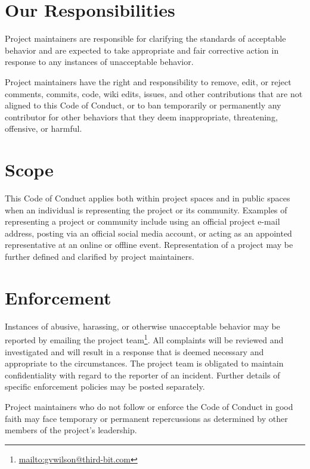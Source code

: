 \documentclass[
]{krantz}
\renewcommand{\href}[2]{#2\footnote{\url{#1}}}
\begin{document}
\hypertarget{conduct-responsibilities}{%
\section{Our Responsibilities}\label{conduct-responsibilities}}

Project maintainers are responsible for clarifying the standards of acceptable
behavior and are expected to take appropriate and fair corrective action in
response to any instances of unacceptable behavior.

Project maintainers have the right and responsibility to remove, edit, or reject
comments, commits, code, wiki edits, issues, and other contributions that are
not aligned to this Code of Conduct, or to ban temporarily or permanently any
contributor for other behaviors that they deem inappropriate, threatening,
offensive, or harmful.

\hypertarget{conduct-scope}{%
\section{Scope}\label{conduct-scope}}

This Code of Conduct applies both within project spaces and in public spaces
when an individual is representing the project or its community. Examples of
representing a project or community include using an official project e-mail
address, posting via an official social media account, or acting as an appointed
representative at an online or offline event. Representation of a project may be
further defined and clarified by project maintainers.

\hypertarget{conduct-enforcement}{%
\section{Enforcement}\label{conduct-enforcement}}

Instances of abusive, harassing, or otherwise unacceptable behavior may be
reported by \href{mailto:gvwilson@third-bit.com}{emailing the project team}. All
complaints will be reviewed and investigated and will result in a response that
is deemed necessary and appropriate to the circumstances. The project team is
obligated to maintain confidentiality with regard to the reporter of an
incident. Further details of specific enforcement policies may be posted
separately.

Project maintainers who do not follow or enforce the Code of Conduct in good
faith may face temporary or permanent repercussions as determined by other
members of the project's leadership.
\end{document}
